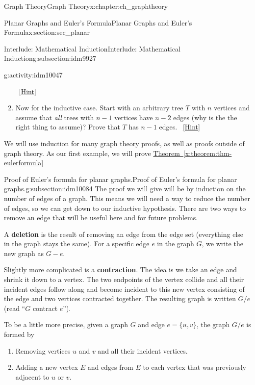 \documentclass[oneside,10pt,]{book}
\newcommand{\terminology}[1]{\textbf{#1}}
\numberwithin{equation}{chapter}
\begin{document}
\begin{chapterptx}{Graph Theory}{}{Graph Theory}{}{}{x:chapter:ch_graphtheory}
\begin{sectionptx}{Planar Graphs and Euler's Formula}{}{Planar Graphs and Euler's Formula}{}{}{x:section:sec_planar}
\begin{subsectionptx}{Interlude: Mathematical Induction}{}{Interlude: Mathematical Induction}{}{}{g:subsection:idm9927}
\begin{activity}{}{g:activity:idm10047}
\begin{enumerate}[font=\bfseries,label=(\alph*),ref=\alph*]
\qquad~\hfill{\tiny\hyperlink{g:hint:idm10064-back}{[Hint]}}\item{}Now for the inductive case.  Start with an arbitrary tree \(T\) with \(n\) vertices and assume that \emph{all} trees with \(n-1\) vertices have \(n-2\) edges (why is the the right thing to assume)?  Prove that \(T\) has \(n-1\) edges.%
\qquad~\hfill{\tiny\hyperlink{g:hint:idm10077-back}{[Hint]}}\end{enumerate}
\end{activity}
We will use induction for many graph theory proofs, as well as proofs outside of graph theory.  As our first example, we will prove \hyperref[x:theorem:thm-eulerformula]{Theorem~\ref{x:theorem:thm-eulerformula}}%
\end{subsectionptx}
%
%
\typeout{************************************************}
\typeout{************************************************}
%
\begin{subsectionptx}{Proof of Euler's formula for planar graphs.}{}{Proof of Euler's formula for planar graphs.}{}{}{g:subsection:idm10084}
The proof we will give will be by induction on the number of edges of a graph.  This means we will need a way to reduce the number of edges, so we can get down to our inductive hypothesis.  There are two ways to remove an edge that will be useful here and for future problems.%
\par
{} A \terminology{deletion} is the result of removing an edge from the edge set (everything else in the graph stays the same).  For a specific edge \(e\) in the graph \(G\), we write the new graph as \(G - e\).%
\par
{} Slightly more complicated is a \terminology{contraction}.  The idea is we take an edge and shrink it down to a vertex.  The two endpoints of the vertex collide and all their incident edges follow along and become incident to this new vertex consisting of the edge and two vertices contracted together.  The resulting graph is written \(G/e\) (read ``\(G\) contract \(e\)'').%
\par
To be a little more precise, given a graph \(G\) and edge \(e = \{u,v\}\), the graph \(G/e\) is formed by%
\begin{enumerate}
\item{}Removing vertices \(u\) and \(v\) and all their incident vertices.%
\item{}Adding a new vertex \(E\) and edges from \(E\) to each vertex that was previously adjacent to \(u\) or \(v\).%

\end{enumerate}
\end{subsectionptx}
\end{sectionptx}
\end{chapterptx}
\end{document}
